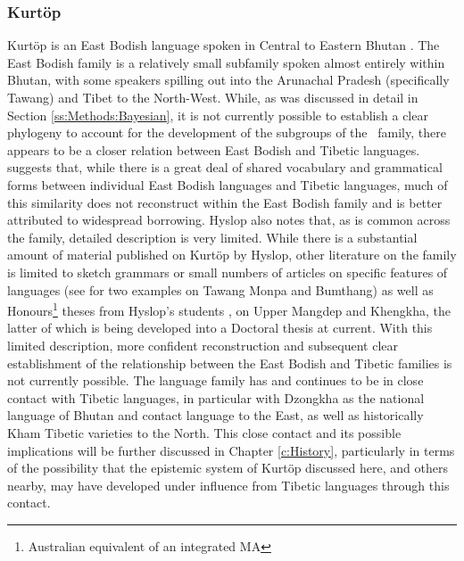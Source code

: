\subsubsection{Kurtöp}\label{sss:Discussion:KurtopCase}
Kurtöp is an East Bodish language spoken in Central to Eastern Bhutan \cite{Hyslop2017}. The East Bodish family is a relatively small subfamily spoken almost entirely within Bhutan, with some speakers spilling out into the Arunachal Pradesh (specifically Tawang) and Tibet to the North-West. While, as was discussed in detail in Section \ref{ss:Methods:Bayesian}, it is not currently possible to establish a clear phylogeny to account for the development of the subgroups of the \lfam\ family, there appears to be a closer relation between East Bodish and Tibetic languages.  suggests that, while there is a great deal of shared vocabulary and grammatical forms between individual East Bodish languages and Tibetic languages, much of this similarity does not reconstruct within the East Bodish family and is better attributed to widespread borrowing. Hyslop also notes that, as is common across the family, detailed description is very limited. While there is a substantial amount of material published on Kurtöp by Hyslop, other literature on the family is limited to sketch grammars or small numbers of articles on specific features of languages (see  for two examples on Tawang Monpa and Bumthang) as well as Honours\footnote{Australian equivalent of an integrated MA} theses from Hyslop's students \cites{Bosch2016}{Hewitt2020}, on Upper Mangdep and Khengkha, the latter of which is being developed into a Doctoral thesis at current. With this limited description, more confident reconstruction and subsequent clear establishment of the relationship between the East Bodish and Tibetic families is not currently possible. The language family has and continues to be in close contact with Tibetic languages, in particular with Dzongkha as the national language of Bhutan and contact language to the East, as well as historically Kham Tibetic varieties to the North. This close contact and its possible implications will be further discussed in Chapter \ref{c:History}, particularly in terms of the possibility that the epistemic system of Kurtöp discussed here, and others nearby, may have developed under influence from Tibetic languages through this contact.


